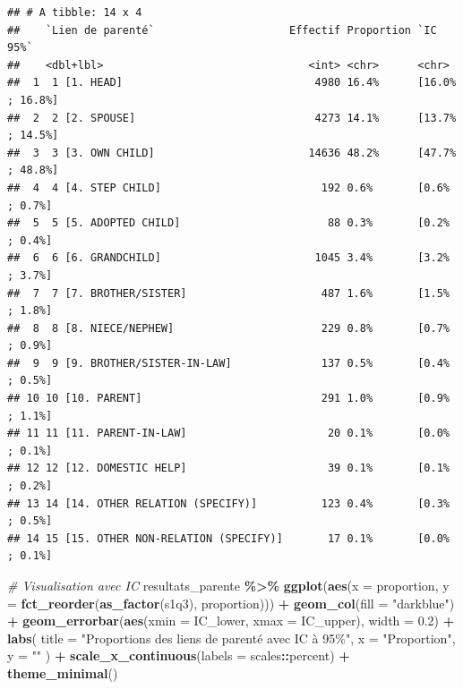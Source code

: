 \documentclass[
]{article}
\newenvironment{Shaded}{\begin{snugshade}}{\end{snugshade}}
\newcommand{\AttributeTok}[1]{\textcolor[rgb]{0.13,0.29,0.53}{#1}}
\newcommand{\CommentTok}[1]{\textcolor[rgb]{0.56,0.35,0.01}{\textit{#1}}}
\newcommand{\FloatTok}[1]{\textcolor[rgb]{0.00,0.00,0.81}{#1}}
\newcommand{\FunctionTok}[1]{\textcolor[rgb]{0.13,0.29,0.53}{\textbf{#1}}}
\newcommand{\NormalTok}[1]{#1}
\newcommand{\SpecialCharTok}[1]{\textcolor[rgb]{0.81,0.36,0.00}{\textbf{#1}}}
\newcommand{\StringTok}[1]{\textcolor[rgb]{0.31,0.60,0.02}{#1}}
\begin{document}
\begin{verbatim}
## # A tibble: 14 x 4
##    `Lien de parenté`                     Effectif Proportion `IC 95%`       
##    <dbl+lbl>                                <int> <chr>      <chr>          
##  1  1 [1. HEAD]                              4980 16.4%      [16.0% ; 16.8%]
##  2  2 [2. SPOUSE]                            4273 14.1%      [13.7% ; 14.5%]
##  3  3 [3. OWN CHILD]                        14636 48.2%      [47.7% ; 48.8%]
##  4  4 [4. STEP CHILD]                         192 0.6%       [0.6% ; 0.7%]  
##  5  5 [5. ADOPTED CHILD]                       88 0.3%       [0.2% ; 0.4%]  
##  6  6 [6. GRANDCHILD]                        1045 3.4%       [3.2% ; 3.7%]  
##  7  7 [7. BROTHER/SISTER]                     487 1.6%       [1.5% ; 1.8%]  
##  8  8 [8. NIECE/NEPHEW]                       229 0.8%       [0.7% ; 0.9%]  
##  9  9 [9. BROTHER/SISTER-IN-LAW]              137 0.5%       [0.4% ; 0.5%]  
## 10 10 [10. PARENT]                            291 1.0%       [0.9% ; 1.1%]  
## 11 11 [11. PARENT-IN-LAW]                      20 0.1%       [0.0% ; 0.1%]  
## 12 12 [12. DOMESTIC HELP]                      39 0.1%       [0.1% ; 0.2%]  
## 13 14 [14. OTHER RELATION (SPECIFY)]          123 0.4%       [0.3% ; 0.5%]  
## 14 15 [15. OTHER NON-RELATION (SPECIFY)]       17 0.1%       [0.0% ; 0.1%]
\end{verbatim}

\begin{Shaded}
\begin{Highlighting}[]
\CommentTok{\# Visualisation avec IC}
\NormalTok{resultats\_parente }\SpecialCharTok{\%\textgreater{}\%}
  \FunctionTok{ggplot}\NormalTok{(}\FunctionTok{aes}\NormalTok{(}\AttributeTok{x =}\NormalTok{ proportion, }\AttributeTok{y =} \FunctionTok{fct\_reorder}\NormalTok{(}\FunctionTok{as\_factor}\NormalTok{(s1q3), proportion))) }\SpecialCharTok{+}
  \FunctionTok{geom\_col}\NormalTok{(}\AttributeTok{fill =} \StringTok{"darkblue"}\NormalTok{) }\SpecialCharTok{+}
  \FunctionTok{geom\_errorbar}\NormalTok{(}\FunctionTok{aes}\NormalTok{(}\AttributeTok{xmin =}\NormalTok{ IC\_lower, }\AttributeTok{xmax =}\NormalTok{ IC\_upper), }\AttributeTok{width =} \FloatTok{0.2}\NormalTok{) }\SpecialCharTok{+}
  \FunctionTok{labs}\NormalTok{(}
    \AttributeTok{title =} \StringTok{"Proportions des liens de parenté avec IC à 95\%"}\NormalTok{,}
    \AttributeTok{x =} \StringTok{"Proportion"}\NormalTok{,}
    \AttributeTok{y =} \StringTok{""}
\NormalTok{  ) }\SpecialCharTok{+}
  \FunctionTok{scale\_x\_continuous}\NormalTok{(}\AttributeTok{labels =}\NormalTok{ scales}\SpecialCharTok{::}\NormalTok{percent) }\SpecialCharTok{+}
  \FunctionTok{theme\_minimal}\NormalTok{()}
\end{Highlighting}
\end{Shaded}
\end{document}
